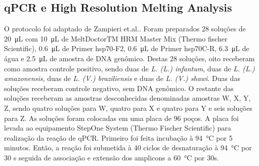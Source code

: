      
\subsection{qPCR e High Resolution Melting Analysis}

O protocolo foi adaptado de Zampieri et.al.\cite{HRMzampi2016}.  Foram
preparados 28 soluções de \qty{20}{\micro\liter} com \qty{10}{\micro\liter} de
MeltDoctorTM HRM Master Mix (Thermo fischer Scientific), \qty{0,6}{\micro\liter}
de Primer hsp70-F2, \qty{0,6}{\micro\liter} de Primer hsp70C-R,
\qty{6,3}{\micro\liter} de água e \qty{2,5}{\micro\liter} de amostra de DNA
genômico. Destas 28 soluções, oito receberam como amostra controle positivo,
sendo duas de \textit{L. (L.) infantum}, duas de \textit{L. (L.) amazonensis},
duas de \textit{L. (V.) braziliensis} e duas de \textit{L. (V.) shawi}. Duas das
soluções receberam controle negativo, sem DNA genômico. O restante das soluções
receberam as amostras desconhecidas denominadas amostras W, X, Y, Z, sendo
quatro soluções para W, quatro para  X e quatro para Y e seis soluções para Z.
As soluções foram colocadas em uma placa de 96 poços. A placa foi levada ao
equipamento StepOne System (Thermo Fischer Scientific) para realização da reação
de qPCR. Primeiro foi feita incubação à \qty{94}{\celsius} por 5 minutos.
Então, a reação foi submetida à 40 ciclos de desnaturação à \qty{94}{\celsius}
por 30 s seguida de associação e extensão dos amplicons  a \qty{60}{\celsius}
por 30s. 


